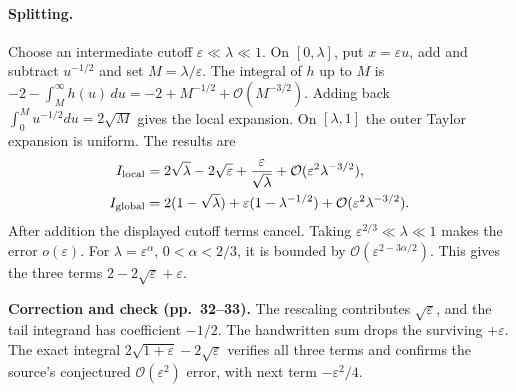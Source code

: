 \documentclass[11pt,a4paper]{article}
\newcommand{\eps}{\varepsilon}
\newcommand{\OO}{\mathcal O}
\newcommand{\edit}[2]{\par\begingroup\small\color{blue!55!black}\textbf{#1.} #2\par\endgroup}
\numberwithin{equation}{section}
\begin{document}
\paragraph{Splitting.}
Choose an intermediate cutoff $\eps\ll\lambda\ll1$. On $[0,\lambda]$,
put $x=\eps u$, add and subtract $u^{-1/2}$ and set $M=\lambda/\eps$.
The integral of $h$ up to $M$ is
$-2-\int_M^\infty h(u)\,du=-2+M^{-1/2}+\OO(M^{-3/2})$.
Adding back $\int_0^M u^{-1/2}du=2\sqrt M$ gives the local expansion.
On $[\lambda,1]$ the outer Taylor expansion is uniform. The results are
\begin{align*}
 I_{\rm local}
 &=2\sqrt\lambda-2\sqrt\eps+\frac{\eps}{\sqrt\lambda}
   +\OO(\eps^2\lambda^{-3/2}),\\
 I_{\rm global}
 &=2(1-\sqrt\lambda)+\eps(1-\lambda^{-1/2})
   +\OO(\eps^2\lambda^{-3/2}).
\end{align*}
After addition the displayed cutoff terms cancel. Taking
$\eps^{2/3}\ll\lambda\ll1$ makes the error $o(\eps)$.
For $\lambda=\eps^\alpha$, $0<\alpha<2/3$, it is bounded by
$\OO(\eps^{2-3\alpha/2})$. This gives the three terms
$2-2\sqrt\eps+\eps$.
\edit{Correction and check (pp.~32--33)}{The rescaling contributes
$\sqrt\eps$, and the tail integrand has coefficient $-1/2$.
The handwritten sum drops the surviving $+\eps$. The exact integral
$2\sqrt{1+\eps}-2\sqrt\eps$ verifies all three terms and confirms
the source's conjectured $\OO(\eps^2)$ error, with next term
$-\eps^2/4$.}

\appendix
\end{document}
